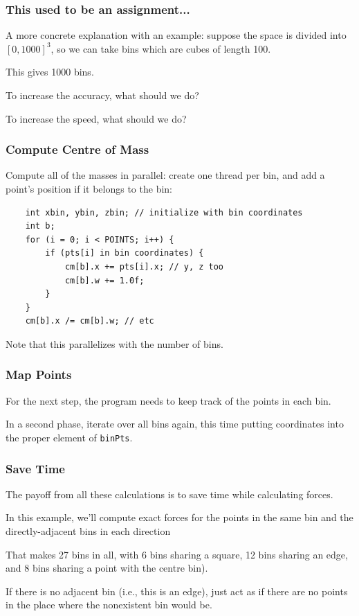 \begin{frame}
\frametitle{This used to be an assignment... }

A more concrete explanation with an example: suppose the space  is divided into $[0, 1000]^3$, so we can take bins which are cubes of length 100. 

This gives 1000 bins. 

To increase the accuracy, what should we do?

To increase the speed, what should we do?

\end{frame}


\begin{frame}[fragile]
\frametitle{Compute Centre of Mass}

Compute all of the masses in parallel: create one thread per bin, and add a point's
position if it belongs to the bin:

\begin{lstlisting}
    int xbin, ybin, zbin; // initialize with bin coordinates
    int b;
    for (i = 0; i < POINTS; i++) {
        if (pts[i] in bin coordinates) {
            cm[b].x += pts[i].x; // y, z too
            cm[b].w += 1.0f;
        }
    }
    cm[b].x /= cm[b].w; // etc
\end{lstlisting}

Note that this parallelizes with the number of bins.


\end{frame}


\begin{frame}
\frametitle{Map Points}

For the next step, the program needs to keep track of the points in
each bin. 

 In a second phase,
iterate over all bins again, this time putting coordinates into the
proper element of {\tt binPts}.

\end{frame}

\begin{frame}
\frametitle{Save Time}

The payoff from all these calculations is to save time while calculating forces. 

In this example, we'll compute exact forces for the points in the same bin and the directly-adjacent bins in each direction

That makes 27 bins in all, with 6 bins sharing a square, 12 bins sharing an edge, and 8 bins sharing a point with the centre bin). 

If there is no adjacent bin 
(i.e., this is an edge), just act as if there are no points 
in the place where the nonexistent bin would be. 

\end{frame}


